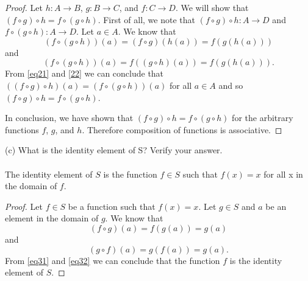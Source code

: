 \documentclass[11pt,a4paper]{article}
\begin{document}
\begin{proof}
Let $h:A\rightarrow B$, $g:B\rightarrow C$, and $f:C\rightarrow D$. We will show that $(f\circ g)\circ h = f\circ (g\circ h)$. First of all, we note that $(f\circ g)\circ h:A\rightarrow D$ and $f\circ (g\circ h):A\rightarrow D$. Let $a\in A$. We know that
\begin{equation}\label{eq21}
(f\circ(g\circ h))(a)=(f\circ g)(h(a))=f(g(h(a)))
\end{equation}
and
\begin{equation}\label{22}
(f\circ(g\circ h))(a) = f((g\circ h)(a)) = f(g(h(a))).
\end{equation}
From \eqref{eq21} and \eqref{22} we can conclude that $((f\circ g)\circ h)(a) = (f\circ (g\circ h))(a)$ for all $a\in A$ and so  $(f\circ g)\circ h = f\circ (g\circ h)$.

In conclusion, we have shown that $(f\circ g)\circ h = f\circ (g\circ h)$ for the arbitrary functions $f$, $g$, and $h$. Therefore composition of functions is associative.
\end{proof}

(c) What is the identity element of S? Verify your answer.\\
~\\
The identity element of $S$ is the function $f\in S$ such that $f(x)=x$ for all x in the domain of $f$.

\begin{proof}
Let $f\in S$ be a function such that $f(x)=x$. Let $g\in S$ and $a$ be an element in the domain of $g$. We know that
\begin{equation}\label{eq31}
(f\circ g)(a) = f(g(a)) = g(a)
\end{equation}
and
\begin{equation}\label{eq32}
(g\circ f)(a) = g(f(a)) = g(a).
\end{equation}
From \eqref{eq31} and \eqref{eq32} we can conclude that the function $f$ is the identity element of $S$.
\end{proof}
\end{document}
